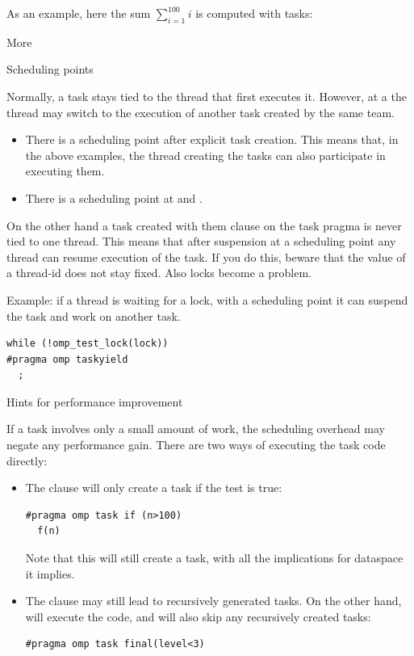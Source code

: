 As an example, here the sum $\sum_{i=1}^{100} i$ is computed with tasks:
%

 {More}

 {Scheduling points}

Normally, a task stays tied to the thread that first executes it.
However, at a  the thread may
switch to the execution of another task created by the same team.
\begin{itemize}
\item There is a scheduling point after explicit task creation. This
  means that, in the above examples, the thread creating the tasks can
  also participate in executing them.
\item There is a scheduling point at  and .
\end{itemize}

On the other hand a task created with them  clause
on the task pragma is never tied to one thread. This means that after
suspension at a scheduling point any thread can resume execution of
the task.
If you do this, beware
that the value of a thread-id does not stay fixed. Also locks become a problem.

Example: if a thread is waiting for a lock, with a scheduling point it
can suspend the task and work on another task.
\begin{lstlisting}[language=omp]
while (!omp_test_lock(lock))
#pragma omp taskyield
  ;
\end{lstlisting}

 {Hints for performance improvement}
\label{sec:omp-task-hint}

If a task involves only a small amount of work,
the scheduling overhead may negate any performance gain.
There are two ways of executing the task code directly:
\begin{itemize}
\item The  clause will only create a task
  if the test is true:
\begin{lstlisting}[language=omp]
#pragma omp task if (n>100)
  f(n)
\end{lstlisting}
Note that this will still create a task, with
all the implications for dataspace it implies.
\item The  clause may still lead to recursively
  generated tasks. On the other hand, 
  will execute the code, and will also skip any recursively created tasks:
\begin{lstlisting}[language=omp]
#pragma omp task final(level<3)
\end{lstlisting}
\end{itemize}

